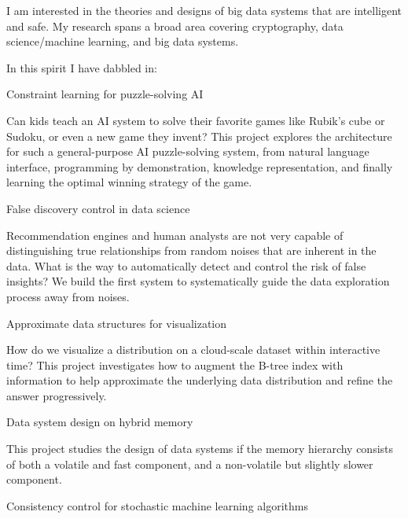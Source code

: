 \documentclass[letterpaper]{article}
\renewenvironment{itemize}{
  \begin{list}{}{
    \setlength{\leftmargin}{1.5em}
  }
}{
  \end{list}
}
\begin{document}
I am interested in the theories and designs of big data systems that are intelligent and safe. My research spans a broad area covering cryptography, data science/machine learning, and big data systems.  

In this spirit I have dabbled in:
\begin{itemize}
	\item Constraint learning for puzzle-solving AI 
		\begin{itemize} 
			\item Can kids teach an AI system to solve their favorite games like Rubik's cube or Sudoku, or even a new game they invent?  This project explores the architecture for such a general-purpose AI puzzle-solving system, from natural language interface, programming by demonstration, knowledge representation, and finally learning the optimal winning strategy of the game.  
		\end{itemize}
	\item False discovery control in data science
		\begin{itemize}
			\item Recommendation engines and human analysts are not very capable of distinguishing true relationships from random noises that are inherent in the data.   What is the way to automatically detect and control the risk of false insights?  We build the first system to systematically guide the data exploration process away from noises.
		\end{itemize}
	\item Approximate data structures for visualization
		\begin{itemize}
			\item How do we visualize a distribution on a cloud-scale dataset within interactive time?  This project investigates how to augment the B-tree index with information to help approximate the underlying data distribution and refine the answer progressively.
		\end{itemize}
	\item Data system design on hybrid memory
		\begin{itemize}
			\item This project studies the design of data systems if the memory hierarchy consists of both a volatile and fast component, and a non-volatile but slightly slower component.  
		\end{itemize}
	\item Consistency control for stochastic machine learning algorithms
		\begin{itemize}

\end{itemize}
\end{itemize}
\end{document}
